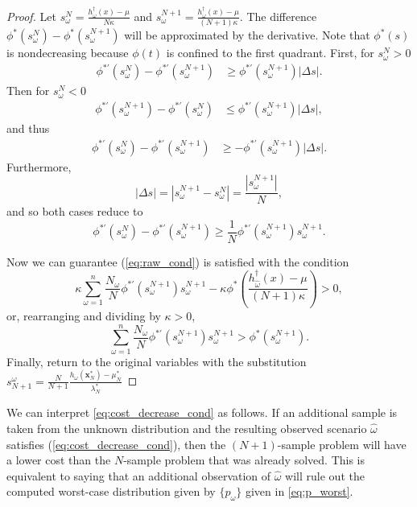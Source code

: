 \documentclass[ijoc,nonblindrev]{informs3} %
\newcommand{\x}{\mathbf{x}}
\begin{document}
\begin{proof}
	Let $s^N_\omega = \frac{h^\dagger_\omega(x) - \mu}{N\kappa}$ and $s^{N+1}_\omega = \frac{h^\dagger_\omega(x) - \mu}{(N+1)\kappa}$.
	The difference $\phi^*(s^N_\omega) - \phi^*(s^{N+1}_\omega)$ will be approximated by the derivative.
	Note that $\phi^*(s)$ is nondecreasing because $\phi(t)$ is confined to the first quadrant.
	First, for $s^N_\omega > 0$
	\begin{align*}
		\phi^{*\prime}(s^N_\omega) - \phi^{*\prime}(s^{N+1}_\omega) & \geq \phi^{*\prime}(s^{N+1}_\omega) |\Delta s|.
	\end{align*}
	Then for $s^N_\omega < 0$
	\begin{align*}
		\phi^{*\prime}(s^{N+1}_\omega) - \phi^{*\prime}(s^N_\omega) & \leq \phi^{*\prime}(s^{N+1}_\omega) |\Delta s|,
	\end{align*}
	and thus
	\begin{align*}
		\phi^{*\prime}(s^N_\omega) - \phi^{*\prime}(s^{N+1}_\omega) & \geq -\phi^{*\prime}(s^{N+1}_\omega) |\Delta s|.
	\end{align*}
	Furthermore, 
	\[
		|\Delta s| = | s^{N+1}_\omega - s^N_\omega | = \frac{|s^{N+1}_\omega|}{N},
	\]
	and so both cases reduce to
	\[
		\phi^{*\prime}(s^N_\omega) - \phi^{*\prime}(s^{N+1}_\omega) \geq \frac{1}{N} \phi^{*\prime}(s^{N+1}_\omega) s^{N+1}_\omega.
	\]

	Now we can guarantee (\ref{eq:raw_cond}) is satisfied with the condition
	\[
		\kappa \sum_{\omega=1}^n \frac{N_\omega}{N} \phi^{*\prime}(s^{N+1}_\omega) s^{N+1}_\omega - \kappa \phi^*\left(\frac{h^\dagger_{\hat{\omega}}(x) - \mu}{(N+1)\kappa}\right) > 0,
	\]
	or, rearranging and dividing by $\kappa > 0$,
	\begin{equation} \label{eq:main_value_derivation}
		\sum_{\omega=1}^n \frac{N_\omega}{N} \phi^{*\prime}(s^{N+1}_\omega) s^{N+1}_\omega > \phi^*(s^{N+1}_\omega).
	\end{equation}
	Finally, return to the original variables with the substitution $s^\omega_{N+1} = \frac{N}{N+1} \frac{h_\omega(\x^*_N) - \mu^*_N}{\lambda^*_N}$
\end{proof}

We can interpret \eqref{eq:cost_decrease_cond} as follows. If an additional sample is taken from the unknown distribution and the resulting observed scenario $\hat{\omega}$ satisfies (\ref{eq:cost_decrease_cond}), then the $(N+1)$-sample problem will have a lower cost than the $N$-sample problem that was already solved.
This is equivalent to saying that an additional observation of $\hat{\omega}$ will rule out the computed worst-case distribution given by $\{p_\omega\}$ given in \eqref{eq:p_worst}.
\end{document}
